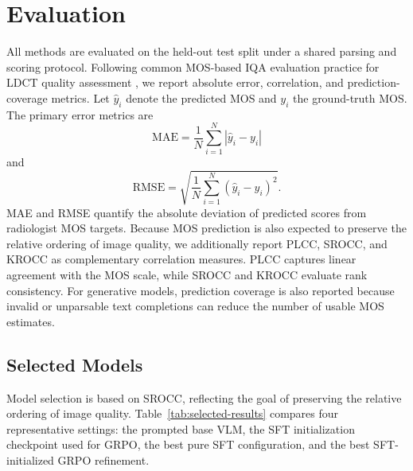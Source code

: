 \chapter{Evaluation}
All methods are evaluated on the held-out test split under a shared parsing and scoring protocol. Following common MOS-based IQA evaluation practice for LDCT quality assessment \cite{lee2025low}, we report absolute error, correlation, and prediction-coverage metrics. Let $\hat{y}_i$ denote the predicted MOS and $y_i$ the ground-truth MOS. The primary error metrics are
\begin{equation}
  \mathrm{MAE}=\frac{1}{N}\sum_{i=1}^{N}|\hat{y}_i-y_i|
\end{equation}
and
\begin{equation}
  \mathrm{RMSE}=\sqrt{\frac{1}{N}\sum_{i=1}^{N}(\hat{y}_i-y_i)^2}.
\end{equation}
MAE and RMSE quantify the absolute deviation of predicted scores from radiologist MOS targets. Because MOS prediction is also expected to preserve the relative ordering of image quality, we additionally report PLCC, SROCC, and KROCC as complementary correlation measures. PLCC captures linear agreement with the MOS scale, while SROCC and KROCC evaluate rank consistency. For generative models, prediction coverage is also reported because invalid or unparsable text completions can reduce the number of usable MOS estimates.

\section{Selected Models}
Model selection is based on SROCC, reflecting the goal of preserving the relative ordering of image quality. Table~\ref{tab:selected-results} compares four representative settings: the prompted base VLM, the SFT initialization checkpoint used for GRPO, the best pure SFT configuration, and the best SFT-initialized GRPO refinement.

\begin{table}[t]
  \centering
  \caption{Overall test-set MOS prediction comparison. Lower MAE/RMSE is better; higher correlation and coverage are better. Best configurations are selected by maximum SROCC.}
  \label{tab:selected-results}
  \scriptsize
  \setlength{\tabcolsep}{2pt}
\end{table}

